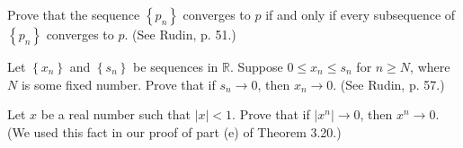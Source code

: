 \documentclass[12pt,letterpaper,boxed,cm]{hmcpset}
\newcommand{\abs}[1]{\left| #1 \right|}
\newcommand{\set}[1]{\left\{#1\right\}}
\newcommand{\R}[0]{\mathbb{R}}
\begin{document}

\begin{problem}[(1)]
    Prove that the sequence $\set{p_n}$ converges to $p$ if and only if every subsequence of $\set{p_n}$ converges to $p$. (See Rudin, p. 51.)
\end{problem}

\begin{solution}
    \vfill
\end{solution}
\newpage

\begin{problem}[(2)]
    Let $\set{x_n}$ and $\set{s_n}$ be sequences in $\R$. Suppose $0 \le x_n \le s_n$ for $n \ge N$, where $N$ is some fixed number. Prove that if $s_n \rightarrow 0$, then $x_n \rightarrow 0$. (See Rudin, p. 57.)
\end{problem}

\begin{solution}
    \vfill
\end{solution}
\newpage

\begin{problem}[(3)]
    Let $x$ be a real number such that $\abs{x} < 1$. Prove that if $\abs{x^n} \rightarrow 0$, then $x^n \rightarrow 0$. (We used this fact in our proof of part (e) of Theorem 3.20.)
\end{problem}

\begin{solution}
    \vfill
\end{solution}
\newpage
\end{document}
